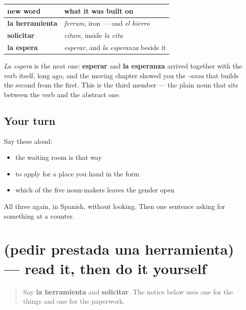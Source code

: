 \begin{grammarlens}[title={Grammar Lens: two of the three were relatives}]
\noindent
\begin{tabularx}{\linewidth}{@{}>{\raggedright\arraybackslash}X>{\raggedright\arraybackslash}X@{}}
\toprule
\textbf{new word} & \textbf{what it was built on} \\
\midrule
\textbf{la herramienta} & \emph{ferrum}, iron — and \emph{el hierro} \\
\textbf{solicitar} & \emph{citare}, inside \emph{la cita} \\
\textbf{la espera} & \emph{esperar}, and \emph{la esperanza} beside it \\
\bottomrule
\end{tabularx}

\emph{La espera} is the neat one: \textbf{esperar} and \textbf{la esperanza} arrived together with the verb itself, long ago, and the moving chapter showed you the \emph{-anza} that builds the second from the first. This is the third member — the plain noun that sits between the verb and the abstract one.
\end{grammarlens}

\subsection*{Your turn}
Say these aloud:

\begin{itemize}
\raggedright
  \item the waiting room is that way
  \item to apply for a place you hand in the form
  \item which of the five noun-makers leaves the gender open
\end{itemize}

\begin{tcolorbox}[breakable,colback=teal!4,colframe=teal!35!black,title={Before you move on}]
All three again, in Spanish, without looking. Then one sentence asking for something at a counter.
\end{tcolorbox}
\section[Practice]{(pedir prestada una herramienta) — read it, then do it yourself}

\label{lesson:ES-C460-sintesis-pedir}



\begin{quote}
Say \textbf{la herramienta} and \textbf{solicitar}. The notice below uses one for the things and one for the paperwork.
\end{quote}

